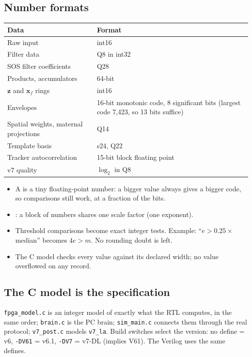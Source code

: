 \documentclass[11pt]{article}
\newcommand{\ttt}[1]{\texttt{#1}}
\begin{document}
\subsection{Number formats}
\begin{center}
\small
\begin{tabularx}{\linewidth}{@{}l X@{}}
\toprule
\textbf{Data} & \textbf{Format} \\
\midrule
Raw input & int16 \\
Filter data & Q8 in int32 \\
SOS filter coefficients & Q28 \\
Products, accumulators & 64-bit \\
$\mathbf{z}$ and $\mathbf{x}_f$ rings & int16 \\
Envelopes & 16-bit monotonic code, 8 significant bits (largest code 7,423, so 13 bits suffice) \\
Spatial weights, maternal projections & Q14 \\
Template basis & s24, Q22 \\
Tracker autocorrelation & 15-bit block floating point \\
v7 quality & $\log_2$ in Q8 \\
\bottomrule
\end{tabularx}
\end{center}
\begin{itemize}
  \item A  is a tiny floating-point number: a bigger value always gives a bigger code, so comparisons still work, at a fraction of the bits.
  \item {}: a block of numbers shares one scale factor (one exponent).
  \item Threshold comparisons become exact integer tests. Example: ``$e > 0.25\times$median'' becomes $4e > m$. No rounding doubt is left.
  \item The C model checks every value against its declared width; no value overflowed on any record.
\end{itemize}

\subsection{The C model is the specification}
\ttt{fpga\_model.c} is an integer model of exactly what the RTL computes, in the same order; \ttt{brain.c} is the PC brain; \ttt{sim\_main.c} connects them through the real protocol; \ttt{v7\_post.c} models \ttt{v7\_la}. Build switches select the version: no define = v6, \ttt{-DV61} = v6.1, \ttt{-DV7} = v7-DL (implies V61). The Verilog uses the same defines.
\end{document}
